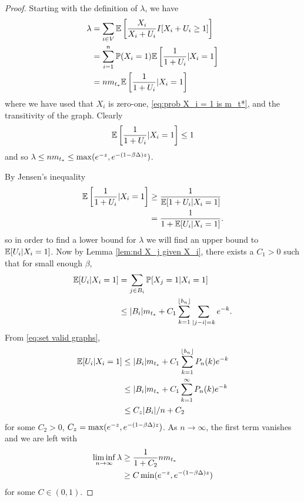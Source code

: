 	\begin{proof}
		Starting with the definition of $\lambda$, we have
		\begin{align}
			\lambda &= \sum_{i \in V} \mathbb{E}\left[\frac{X_i}{X_i + U_i} I[ X_i + U_i \geq 1] \right]\\
				&= \sum_{i = 1}^n \mathbb{P}(X_i = 1) \mathbb{E} \left[\frac{1}{1 + U_i}| X_i = 1\right]\\
				&= n m_{t_*} \mathbb{E} \left[\frac{1}{1 + U_i}| X_i = 1\right]
		\end{align}
		where we have used that $X_i$ is zero-one, \eqref{eq:prob X_i = 1 is m_t*}, and the transitivity of the graph.
		Clearly 
		\begin{align}
			\mathbb{E} \left[\frac{1}{1 + U_i}| X_i = 1\right] \leq 1
		\end{align}
		and so $\lambda \leq n m_{t_*} \leq \max(e^{-z}, e^{-(1 - \beta\Delta)z})$.

		By Jensen's inequality
		\begin{align}
			\mathbb{E} \left[\frac{1}{1 + U_i}| X_i = 1\right] &\geq \frac{1}{\mathbb{E}[1 + U_i | X_i = 1]}\\
				&= \frac{1}{1 + \mathbb{E}[U_i | X_i = 1]}.
		\end{align}
		so in order to find a lower bound for $\lambda$ we will find an upper bound to $\mathbb{E}[U_i | X_i = 1]$. Now by Lemma \ref{lem:nd X_j given X_i}, there exists a $C_1>0$ such that for small enough $\beta$,
		\begin{align}
			\mathbb{E}[U_i | X_i = 1] &= \sum_{j \in B_i} \mathbb{P}[X_j = 1| X_i = 1]\\
				& \leq |B_i| m_{t_*} + C_1\sum_{k=1}^{\lfloor b_n \rfloor} \sum_{|j - i| = k} e^{-k}.
		\end{align}
		From \eqref{eq:set valid graphs},
		\begin{align}
			\mathbb{E}[U_i | X_i = 1] &\leq |B_i|m_{t_*} + C_1 \sum_{k=1}^{\lfloor b_n \rfloor} P_n(k) e^{-k}\\
			&\leq |B_i|m_{t_*} + C_1 \sum_{k=1}^{\infty} P_n(k) e^{-k}\\
			&\leq C_z|B_i|/n + C_2
		\end{align}
		for some $C_2 > 0$, $C_z = \max(e^{-z}, e^{-(1 - \beta \Delta)z})$.
		As $n \rightarrow \infty$, the first term vanishes and we are left with \begin{align}
			\liminf_{n \rightarrow \infty} \lambda &\geq \frac{1}{1 + C_2} n m_{t_*}\\
				&\geq C \min(e^{-z}, e^{-(1 - \beta\Delta)z}) 
		\end{align}
		for some $C \in (0, 1)$.
	\end{proof}

